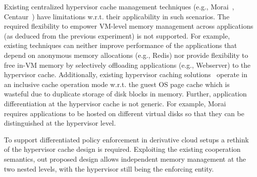 %
Existing centralized hypervisor cache management 
techniques (e.g., Morai~\cite{sdc}, Centaur~\cite{centaur}) have
limitations w.r.t. their applicability in such scenarios.
%
The required flexibility to empower VM-level memory management across
applications (as deduced from the previous experiment) is not supported.
%
For example, existing techniques can neither improve performance of the 
applications that depend on anonymous memory allocations (e.g., Redis) 
nor provide flexibility to free in-VM memory by selectively offloading 
applications (e.g., Webserver) to the hypervisor cache.
%
Additionally, existing hypervisor caching solutions~\cite{sdc,centaur}
%
operate in an inclusive cache operation mode
w.r.t. the guest OS page cache which is wasteful due to duplicate 
storage of disk blocks in memory.
%
Further, application differentiation at the hypervisor cache is not
generic. For example, Morai~\cite{sdc} requires applications to be 
hosted on different virtual disks so that they can be distinguished at the
hypervisor level.
%

%
To support differentiated policy enforcement in derivative cloud setups
a rethink of the hypervisor cache design is required.    
%
Exploiting the existing cooperation semantics, %
out proposed design %
allows independent memory management at the two nested levels,
with the hypervisor still being the enforcing entity. 
%
